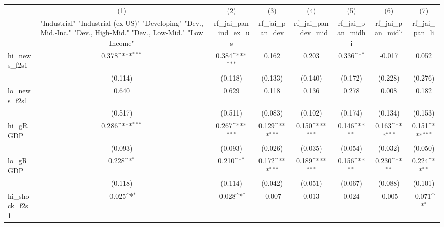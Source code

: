 {
\def\sym#1{\ifmmode^{#1}\else\(^{#1}\)\fi}
\begin{tabular}{l*{7}{c}}
\toprule
            &\multicolumn{1}{c}{(1)}&\multicolumn{1}{c}{(2)}&\multicolumn{1}{c}{(3)}&\multicolumn{1}{c}{(4)}&\multicolumn{1}{c}{(5)}&\multicolumn{1}{c}{(6)}&\multicolumn{1}{c}{(7)}\\
            &\multicolumn{1}{c}{ "Industrial" "Industrial (ex-US)" "Developing" "Dev., Mid.-Inc." "Dev., High-Mid."  "Dev., Low-Mid." "Low Income" }&\multicolumn{1}{c}{rf\_jai\_pan\_ind\_ex\_us}&\multicolumn{1}{c}{rf\_jai\_pan\_dev}&\multicolumn{1}{c}{rf\_jai\_pan\_dev\_mid}&\multicolumn{1}{c}{rf\_jai\_pan\_midhi}&\multicolumn{1}{c}{rf\_jai\_pan\_midli}&\multicolumn{1}{c}{rf\_jai\_pan\_li}\\
\midrule
hi\_news\_f2s1&       0.378\sym{***}&       0.384\sym{***}&       0.162         &       0.203         &       0.336\sym{*}  &      -0.017         &       0.052         \\
            &     (0.114)         &     (0.118)         &     (0.133)         &     (0.140)         &     (0.172)         &     (0.228)         &     (0.276)         \\
\addlinespace
lo\_news\_f2s1&       0.640         &       0.629         &       0.118         &       0.136         &       0.278         &       0.008         &       0.182         \\
            &     (0.517)         &     (0.511)         &     (0.083)         &     (0.102)         &     (0.174)         &     (0.134)         &     (0.153)         \\
\addlinespace
hi\_gRGDP    &       0.286\sym{***}&       0.267\sym{***}&       0.129\sym{***}&       0.150\sym{***}&       0.146\sym{**} &       0.163\sym{***}&       0.151\sym{***}\\
            &     (0.093)         &     (0.093)         &     (0.026)         &     (0.035)         &     (0.054)         &     (0.032)         &     (0.050)         \\
\addlinespace
lo\_gRGDP    &       0.228\sym{*}  &       0.210\sym{*}  &       0.172\sym{***}&       0.189\sym{***}&       0.156\sym{**} &       0.230\sym{**} &       0.224\sym{**} \\
            &     (0.118)         &     (0.114)         &     (0.042)         &     (0.051)         &     (0.067)         &     (0.088)         &     (0.101)         \\
\addlinespace
hi\_shock\_f2s1&      -0.025\sym{*}  &      -0.028\sym{*}  &      -0.007         &       0.013         &       0.024         &      -0.005         &      -0.071\sym{*}  \\

\end{tabular}}
